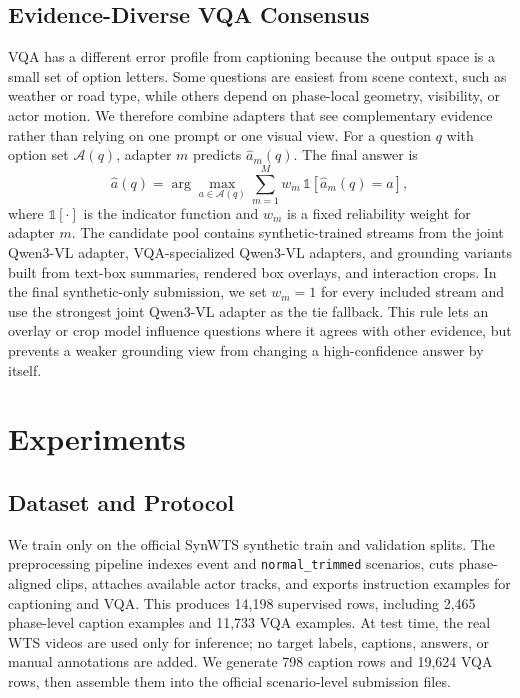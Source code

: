 \documentclass[runningheads]{llncs}
\begin{document}
\subsection{Evidence-Diverse VQA Consensus}

VQA has a different error profile from captioning because the output space is a small set of option letters. Some questions are easiest from scene context, such as weather or road type, while others depend on phase-local geometry, visibility, or actor motion. We therefore combine adapters that see complementary evidence rather than relying on one prompt or one visual view. For a question $q$ with option set $\mathcal{A}(q)$, adapter $m$ predicts $\widehat{a}_{m}(q)$. The final answer is
\begin{equation}
    \widehat{a}(q)
    =
    \arg\max_{a\in\mathcal{A}(q)}
    \sum_{m=1}^{M}
    w_m\,
    \mathbb{1}\!\left[\widehat{a}_{m}(q)=a\right],
    \label{eq:vqa_vote}
\end{equation}
where $\mathbb{1}[\cdot]$ is the indicator function and $w_m$ is a fixed reliability weight for adapter $m$. The candidate pool contains synthetic-trained streams from the joint Qwen3-VL adapter, VQA-specialized Qwen3-VL adapters, and grounding variants built from text-box summaries, rendered box overlays, and interaction crops. In the final synthetic-only submission, we set $w_m=1$ for every included stream and use the strongest joint Qwen3-VL adapter as the tie fallback. This rule lets an overlay or crop model influence questions where it agrees with other evidence, but prevents a weaker grounding view from changing a high-confidence answer by itself.


\section{Experiments}

\subsection{Dataset and Protocol}

We train only on the official SynWTS synthetic train and validation splits. The preprocessing pipeline indexes event and \texttt{normal\_trimmed} scenarios, cuts phase-aligned clips, attaches available actor tracks, and exports instruction examples for captioning and VQA. This produces 14,198 supervised rows, including 2,465 phase-level caption examples and 11,733 VQA examples. At test time, the real WTS videos are used only for inference; no target labels, captions, answers, or manual annotations are added. We generate 798 caption rows and 19,624 VQA rows, then assemble them into the official scenario-level submission files.
\end{document}
